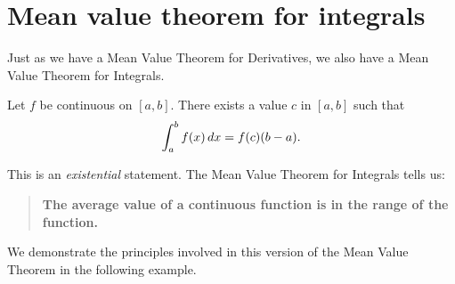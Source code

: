 \documentclass{ximera}
\begin{document}
\section{Mean value theorem for integrals}

Just as we have a Mean Value Theorem for Derivatives, we also have a
Mean Value Theorem for Integrals.


\begin{theorem}
Let $f$ be continuous on $[a,b]$. There exists a value $c$ in $[a,b]$
such that
\[
\int_a^bf(x)\,d x = f(c)(b-a).
\]
\end{theorem}

This is an \emph{existential} statement. The Mean Value Theorem for
Integrals tells us:
\begin{quote}
\textbf{The average value of a continuous function is in the range of
  the function.}
\end{quote}

We demonstrate the principles involved in this version of the Mean
Value Theorem in the following example.
\end{document}
